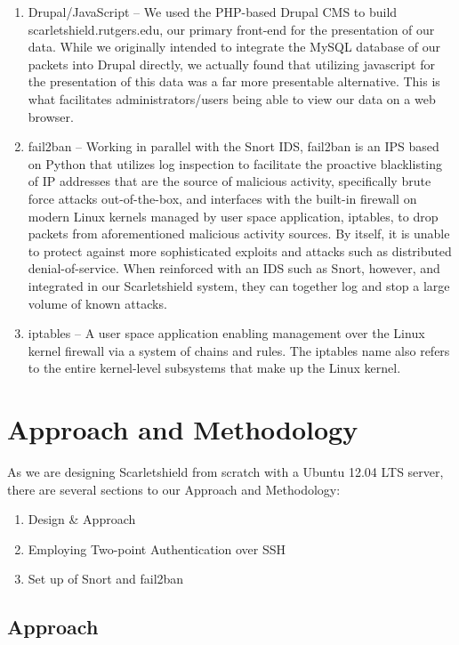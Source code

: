 \documentclass[12pt,letterpaper,titlepage]{report}
\begin{document}
{\begin{enumerate}
\item Drupal/JavaScript -- We used the PHP-based Drupal CMS to build
scarletshield.rutgers.edu, our primary front-end for the presentation of our
data. While we originally intended to integrate the MySQL database of our
packets into Drupal directly, we actually found that utilizing javascript for
the presentation of this data was a far more presentable alternative.  This is
what facilitates administrators/users being able to view our data on a web
browser.

\item fail2ban -- Working in parallel with the Snort IDS, fail2ban is an IPS based
on Python that utilizes log inspection to facilitate the proactive blacklisting
of IP addresses that are the source of malicious activity, specifically brute
force attacks out-of-the-box, and interfaces with the built-in firewall on
modern Linux kernels managed by user space application, iptables, to drop
packets from aforementioned malicious activity sources.  By itself, it is unable
to protect against more sophisticated exploits and attacks such as distributed
denial-of-service.  When reinforced with an IDS such as Snort, however, and
integrated in our Scarletshield system, they can together log and stop a large
volume of known attacks.

\item iptables -- A user space application enabling management over the Linux kernel
firewall via a system of chains and rules.  The iptables name also refers to the
entire kernel-level subsystems that make up the Linux kernel.
   
\end{enumerate}


\chapter{Approach and Methodology}

As we are designing Scarletshield from scratch with a Ubuntu 12.04 LTS server,
there are several sections to our Approach and Methodology:

\begin{enumerate}
\itemsep0em
\item Design \& Approach
\item Employing Two-point Authentication over SSH
\item Set up of Snort and fail2ban
\end{enumerate}

\section{Approach}

}
\end{document}
